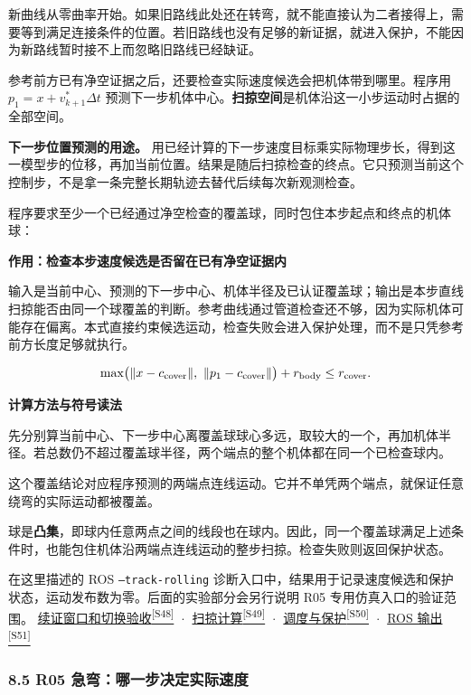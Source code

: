 \documentclass[12pt,a4paper]{article}
\numberwithin{equation}{topic}
\newcommand{\sourceref}[2]{\hyperlink{source-#1}{#2\textsuperscript{[#1]}}}
\begin{document}
新曲线从零曲率开始。如果旧路线此处还在转弯，就不能直接认为二者接得上，需要等到满足连接条件的位置。若旧路线也没有足够的新证据，就进入保护，不能因为新路线暂时接不上而忽略旧路线已经缺证。

参考前方已有净空证据之后，还要检查实际速度候选会把机体带到哪里。程序用 \(p_1=x+v^*_{k+1}\Delta t\) 预测下一步机体中心。\textbf{扫掠空间}是机体沿这一小步运动时占据的全部空间。

\textbf{下一步位置预测的用途。} 用已经计算的下一步速度目标乘实际物理步长，得到这一模型步的位移，再加当前位置。结果是随后扫掠检查的终点。它只预测当前这个控制步，不是拿一条完整长期轨迹去替代后续每次新观测检查。

程序要求至少一个已经通过净空检查的覆盖球，同时包住本步起点和终点的机体球：

\noindent\textbf{作用：检查本步速度候选是否留在已有净空证据内}\par\nobreak
输入是当前中心、预测的下一步中心、机体半径及已认证覆盖球；输出是本步直线扫掠能否由同一个球覆盖的判断。参考曲线通过管道检查还不够，因为实际机体可能存在偏离。本式直接约束候选运动，检查失败会进入保护处理，而不是只凭参考前方长度足够就执行。

\begin{equation}
\label{eq:sweep}
\max\bigl(\|x-c_{\rm cover}\|,\ \|p_1-c_{\rm cover}\|\bigr)
+r_{\rm body}\le r_{\rm cover}.
\end{equation}

\noindent\textbf{计算方法与符号读法}\par\nobreak
先分别算当前中心、下一步中心离覆盖球球心多远，取较大的一个，再加机体半径。若总数仍不超过覆盖球半径，两个端点的整个机体都在同一个已检查球内。

这个覆盖结论对应程序预测的两端点连线运动。它并不单凭两个端点，就保证任意绕弯的实际运动都被覆盖。


球是\textbf{凸集}，即球内任意两点之间的线段也在球内。因此，同一个覆盖球满足上述条件时，也能包住机体沿两端点连线运动的整步扫掠。检查失败则返回保护状态。

在这里描述的 ROS \texttt{--track-rolling} 诊断入口中，结果用于记录速度候选和保护状态，运动发布数为零。后面的实验部分会另行说明 R05 专用仿真入口的验证范围。 \sourceref{S48}{续证窗口和切换验收} · \sourceref{S49}{扫掠计算} · \sourceref{S50}{调度与保护} · \sourceref{S51}{ROS 输出}

\hypertarget{r05-speed}{}
\subsubsection*{8.5 R05 急弯：哪一步决定实际速度}
\end{document}
